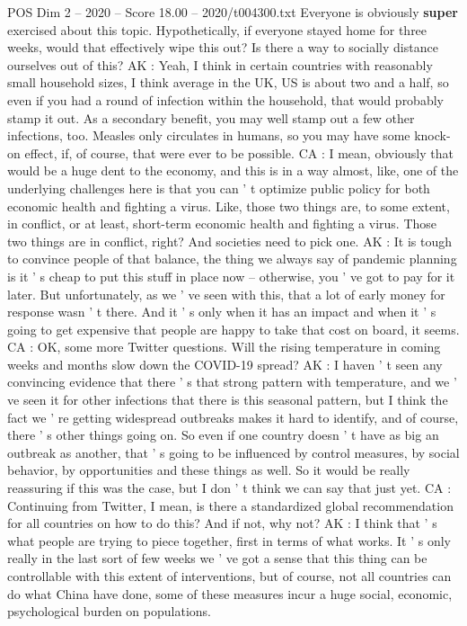 \begin{textsample}{POS Dim 2 – 2020 – Score 18.00 – 2020/t004300.txt}
Everyone is obviously \textbf{super} exercised about this topic.
Hypothetically, if everyone stayed home for three weeks, would that effectively wipe this out?
Is there a way to socially distance ourselves out of this?
AK : Yeah, I think in certain countries with reasonably small household sizes, I think average in the UK, US is about two and a half, so even if you had a round of infection within the household, that would probably stamp it out.
As a secondary benefit, you may well stamp out a few other infections, too.
Measles only circulates in humans, so you may have some knock-on effect, if, of course, that were ever to be possible.
CA : I mean, obviously that would be a huge dent to the economy, and this is in a way almost, like, one of the underlying challenges here is that you can ' t optimize public policy for both economic health and fighting a virus.
Like, those two things are, to some extent, in conflict, or at least, short-term economic health and fighting a virus.
Those two things are in conflict, right?
And societies need to pick one.
AK : It is tough to convince people of that balance, the thing we always say of pandemic planning is it ' s cheap to put this stuff in place now -- otherwise, you ' ve got to pay for it later.
But unfortunately, as we ' ve seen with this, that a lot of early money for response wasn ' t there.
And it ' s only when it has an impact and when it ' s going to get expensive that people are happy to take that cost on board, it seems.
CA : OK, some more Twitter questions.
Will the rising temperature in coming weeks and months slow down the COVID-19 spread?
AK : I haven ' t seen any convincing evidence that there ' s that strong pattern with temperature, and we ' ve seen it for other infections that there is this seasonal pattern, but I think the fact we ' re getting widespread outbreaks makes it hard to identify, and of course, there ' s other things going on.
So even if one country doesn ' t have as big an outbreak as another, that ' s going to be influenced by control measures, by social behavior, by opportunities and these things as well.
So it would be really reassuring if this was the case, but I don ' t think we can say that just yet.
CA : Continuing from Twitter, I mean, is there a standardized global recommendation for all countries on how to do this?
And if not, why not?
AK : I think that ' s what people are trying to piece together, first in terms of what works.
It ' s only really in the last sort of few weeks we ' ve got a sense that this thing can be controllable with this extent of interventions, but of course, not all countries can do what China have done, some of these measures incur a huge social, economic, psychological burden on populations.

\end{textsample}

